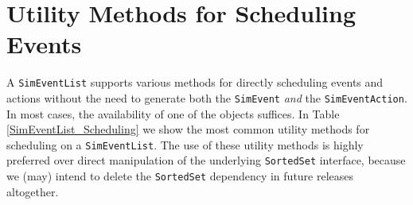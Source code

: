 \section{Utility Methods for Scheduling Events}

A \lstinline{SimEventList} supports various methods for
  directly scheduling events and actions
  without the need to generate both
  the \lstinline{SimEvent} {\em and\/} the \lstinline{SimEventAction}.
In most cases, the availability of one of the objects suffices.
In Table \ref{SimEventList_Scheduling}
  we show the most common utility methods for scheduling on a \lstinline{SimEventList}.
The use of these utility methods is highly preferred over
  direct manipulation of the underlying \lstinline|SortedSet| interface,
  because we (may) intend to delete the \lstinline|SortedSet|
  dependency in future releases altogether.


